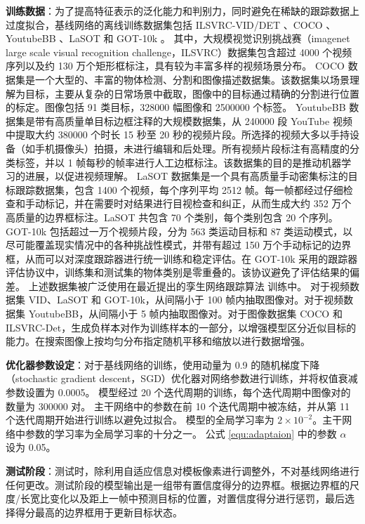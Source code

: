 \textbf{训练数据}：为了提高特征表示的泛化能力和判别力，同时避免在稀缺的跟踪数据上过度拟合，基线网络的离线训练数据集包括 ILSVRC-VID/DET \cite{VID}、COCO \cite{COCO}、YoutubeBB \cite{real2017youtube}、LaSOT \cite{LaSOT} 和 GOT-10k \cite{GOT-10k}。
其中，大规模视觉识别挑战赛（imagenet large scale visual recognition challenge，ILSVRC）数据集包含超过 4000 个视频序列以及约 130 万个矩形框标注，具有较为丰富多样的视频场景分布。
COCO 数据集是一个大型的、丰富的物体检测、分割和图像描述数据集。该数据集以场景理解为目标，主要从复杂的日常场景中截取，图像中的目标通过精确的分割进行位置的标定。图像包括 91 类目标，328000 幅图像和 2500000 个标签。
YoutubeBB 数据集是带有高质量单目标边框注释的大规模数据集，从 240000 段 YouTube 视频中提取大约 380000 个时长 15 秒至 20 秒的视频片段。所选择的视频大多以手持设备（如手机摄像头）拍摄，未进行编辑和后处理。所有视频片段标注有高精度的分类标签，并以 1 帧每秒的帧率进行人工边框标注。该数据集的目的是推动机器学习的进展，以促进视频理解。
LaSOT 数据集是一个具有高质量手动密集标注的目标跟踪数据集，包含 1400 个视频，每个序列平均 2512 帧。每一帧都经过仔细检查和手动标记，并在需要时对结果进行目视检查和纠正，从而生成大约 352 万个高质量的边界框标注。LaSOT 共包含 70 个类别，每个类别包含 20 个序列。
GOT-10k \cite{GOT-10k} 包括超过一万个视频片段，分为 563 类运动目标和 87 类运动模式，以尽可能覆盖现实情况中的各种挑战性模式，并带有超过 150 万个手动标记的边界框，从而可以对深度跟踪器进行统一训练和稳定评估。在 GOT-10k 采用的跟踪器评估协议中，训练集和测试集的物体类别是零重叠的。该协议避免了评估结果的偏差。
上述数据集被广泛使用在最近提出的孪生网络跟踪算法 \cite{SiamRPN++,Wang2018SiamMask} 训练中。
对于视频数据集 VID、LaSOT 和 GOT-10k，从间隔小于 100 帧内抽取图像对。对于视频数据集 YoutubeBB，从间隔小于 5 帧内抽取图像对。对于图像数据集 COCO 和 ILSVRC-Det，生成负样本对作为训练样本的一部分，以增强模型区分近似目标的能力。在搜索图像上按均匀分布指定随机平移和缩放以进行数据增强。

\textbf{优化器参数设定}：对于基线网络的训练，使用动量为 0.9 的随机梯度下降（stochastic gradient descent，SGD）优化器对网络参数进行训练，并将权值衰减参数设置为 0.0005。
模型经过 20 个迭代周期的训练，每个迭代周期中图像对的数量为 300000 对。
主干网络中的参数在前 10 个迭代周期中被冻结，并从第 11 个迭代周期开始进行训练以避免过拟合。
模型的全局学习率为 $2\times 10^{-2}$。主干网络中参数的学习率为全局学习率的十分之一。
公式 \ref{equ:adaptaion} 中的参数 $\alpha$ 设为 0.05。

\textbf{测试阶段}：测试时，除利用自适应信息对模板像素进行调整外，不对基线网络进行任何更改。测试阶段的模型输出是一组带有置信度得分的边界框。根据边界框的尺度/长宽比变化以及距上一帧中预测目标的位置，对置信度得分进行惩罚，最后选择得分最高的边界框用于更新目标状态。

